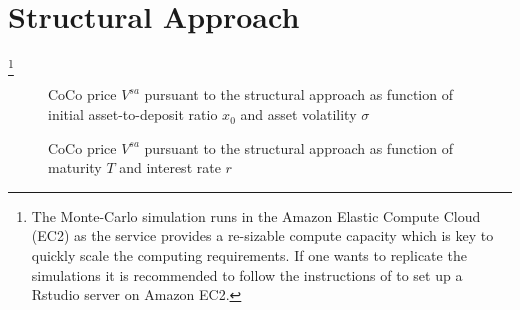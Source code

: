 \section{Structural Approach}\label{sensistructural}

\footnote{The Monte-Carlo simulation runs in the Amazon Elastic Compute Cloud (EC2) as the service provides a re-sizable compute capacity which is key to quickly scale the computing requirements. If one wants to replicate the simulations it is recommended to follow the instructions of \citet{amazonrstudio} to set up a Rstudio server on Amazon EC2.}
\begin{figure}[H]
\centering
    \caption[CoCo price $V^{sa}$ as function of asset-to-deposit ratio and asset volatility]{CoCo price $V^{sa}$ pursuant to the structural approach \citep{pennacchi2010structural} as function of initial asset-to-deposit ratio $x_0$ and asset volatility $\sigma$}
  \end{figure}

\begin{figure}[H]
\centering
    \caption[CoCo price $V^{sa}$ as function of asset-to-deposit ratio and asset volatility]{CoCo price $V^{sa}$ pursuant to the structural approach \citep{pennacchi2010structural} as function of maturity $T$ and interest rate $r$}
  \end{figure}

